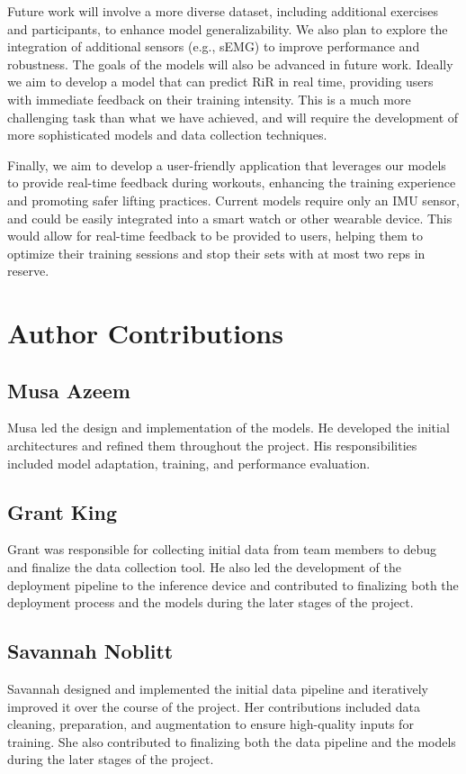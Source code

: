 \documentclass[conference]{IEEEtran}
\begin{document}
Future work will involve a more diverse dataset, including additional exercises and participants, to enhance model generalizability. We also plan to explore the integration of additional sensors (e.g., sEMG) to improve performance and robustness. The goals of the models will also be advanced in future work. Ideally we aim to develop a model that can predict RiR in real time, providing users with immediate feedback on their training intensity. This is a much more challenging task than what we have achieved, and will require the development of more sophisticated models and data collection techniques.

Finally, we aim to develop a user-friendly application that leverages our models to provide real-time feedback during workouts, enhancing the training experience and promoting safer lifting practices. Current models require only an IMU sensor, and could be easily integrated into a smart watch or other wearable device. This would allow for real-time feedback to be provided to users, helping them to optimize their training sessions and stop their sets with at most two reps in reserve.

\section{Author Contributions}

\subsection{Musa Azeem}
Musa led the design and implementation of the models. He developed the initial architectures and refined them throughout the project. His responsibilities included model adaptation, training, and performance evaluation.

\subsection{Grant King}
Grant was responsible for collecting initial data from team members to debug and finalize the data collection tool. He also led the development of the deployment pipeline to the inference device and contributed to finalizing both the deployment process and the models during the later stages of the project.

\subsection{Savannah Noblitt}
Savannah designed and implemented the initial data pipeline and iteratively improved it over the course of the project. Her contributions included data cleaning, preparation, and augmentation to ensure high-quality inputs for training. She also contributed to finalizing both the data pipeline and the models during the later stages of the project.



\end{document}
